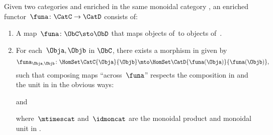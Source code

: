 \begin{ctdefinition}
	\label{def:enrichedfunctor}
	Given two categories \CatC and \CatD enriched in the same monoidal category \CatV, an enriched functor~$\funa\colon \CatC \to \CatD$ consists of:
	\begin{enumerate}
		\item A map~$\funa\colon \ObC \sto \ObD$ that maps objects of~\CatC to objects of~\CatD.
		\item For each~$\Obja, \Objb$ in $\ObC$, there exists a morphism in \CatV given by
		      \begin{equation*}
			      \funa_{\Obja, \Objb} \colon \HomSet\CatC{\Obja}{\Objb} \mto \HomSet\CatD{\funa(\Obja)}{\funa(\Objb)},
		      \end{equation*}
		      such that composing maps ``across~$\funa$'' respects the composition in \CatC and the unit in \CatV in the obvious ways:
		      \begin{center}
		      \end{center}
		      and
		      \begin{center}
		      \end{center}
		      where~$\mtimescat$ and~$\idmoncat$ are the monoidal product and monoidal unit in \CatV.
	\end{enumerate}
\end{ctdefinition}



